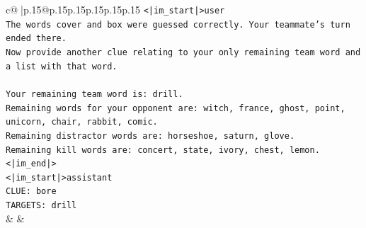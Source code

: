 \documentclass{article}
\begin{document}
{\begin{supertabular}{c@{$\;$}|p{.15\linewidth}@{}p{.15\linewidth}p{.15\linewidth}p{.15\linewidth}p{.15\linewidth}p{.15\linewidth}}
{{{\texttt{<|im\_start|>user} \\
\texttt{The words cover and box were guessed correctly. Your teammate's turn ended there.} \\
\texttt{Now provide another clue relating to your only remaining team word and a list with that word.} \\
\\ 
\texttt{Your remaining team word is: drill.} \\
\texttt{Remaining words for your opponent are: witch, france, ghost, point, unicorn, chair, rabbit, comic.} \\
\texttt{Remaining distractor words are: horseshoe, saturn, glove.} \\
\texttt{Remaining kill words are: concert, state, ivory, chest, lemon.<|im\_end|>} \\
\texttt{<|im\_start|>assistant} \\
\texttt{CLUE: bore} \\
\texttt{TARGETS: drill} \\
            }
        }
    }
    & & \\ \\


\end{supertabular}}
\end{document}
